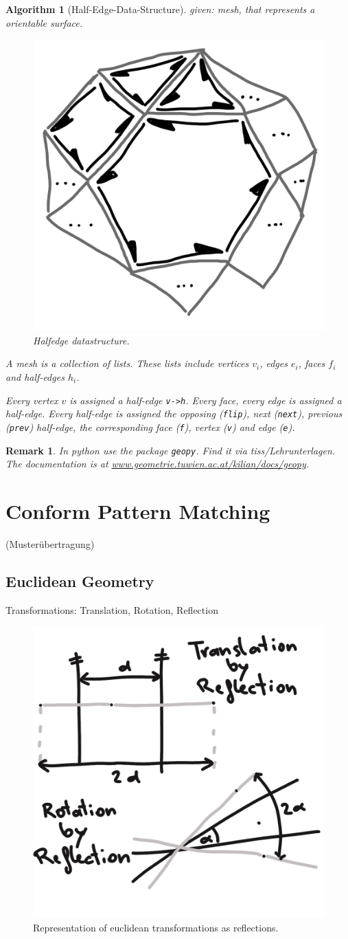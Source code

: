 \documentclass[]{article}
\newtheorem{algorithm}{Algorithm}
\newtheorem{remark}{Remark}
\begin{document}
\begin{algorithm}[Half-Edge-Data-Structure]
	given: mesh, that represents a orientable surface.
	
	\begin{figure}[h!]
		\centering
		\includegraphics[width=0.3\linewidth]{figures/halfedge}
		\caption{Halfedge datastructure.}
		\label{fig:halfedge}
	\end{figure}
	
	A mesh is a collection of lists. These lists include vertices $v_i$, edges $e_i$, faces $f_i$ and half-edges $h_i$.
	
	Every vertex $v$ is assigned a half-edge \texttt{v->h}. Every face, every edge is assigned a half-edge. Every half-edge is assigned the opposing (\texttt{flip}), next (\texttt{next}), previous (\texttt{prev}) half-edge, the corresponding face (\texttt{f}), vertex (\texttt{v}) and edge (\texttt{e}).
\end{algorithm}

\begin{remark}
	In python use the package \texttt{geopy}. Find it via tiss/Lehrunterlagen. The documentation is at \url{www.geometrie.tuwien.ac.at/kilian/docs/geopy}.
\end{remark}

\section{Conform Pattern Matching}
(Musterübertragung)

\subsection{Euclidean Geometry}

Transformations: Translation, Rotation, Reflection

\begin{figure}[h!]
	\centering
	\includegraphics[width=0.3\linewidth]{figures/euclidean_transformation_reflection}
	\caption{Representation of euclidean transformations as reflections.}
	\label{fig:euclidean_transformation_reflection}
\end{figure}
\end{document}

